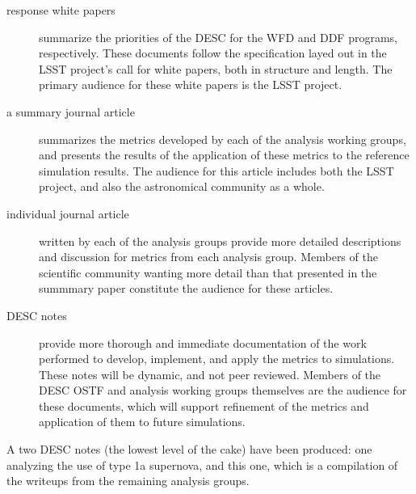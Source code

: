 \begin{description}
  \item[response white papers] summarize the priorities of the DESC
    for the WFD and DDF programs, respectively. These documents follow
    the specification layed out in the LSST project's call for white
    papers, both in structure and length. The primary audience for
    these white papers is the LSST project.
  \item[a summary journal article] summarizes the metrics developed by
    each of the analysis working groups, and presents the results of
    the application of these metrics to the reference simulation
    results. The audience for this article includes both the LSST
    project, and also the astronomical community as a whole.
  \item[individual journal article] written by each of the analysis
    groups provide more detailed descriptions and discussion for
    metrics from each analysis group. Members of the scientific
    community wanting more detail than that presented in the summmary
    paper constitute the audience for these articles.
  \item[DESC notes] provide more thorough and immediate documentation
    of the work performed to develop, implement, and apply the metrics
    to simulations. These notes will be dynamic, and not peer
    reviewed. Members of the DESC OSTF and analysis working groups
    themselves are the audience for these documents, which will
    support refinement of the metrics and application of them to
    future simulations.
\end{description}


A two DESC notes (the lowest level of the cake) have been produced:
one analyzing the use of type 1a supernova, and this one, which is a
compilation of the writeups from the remaining analysis groups.

